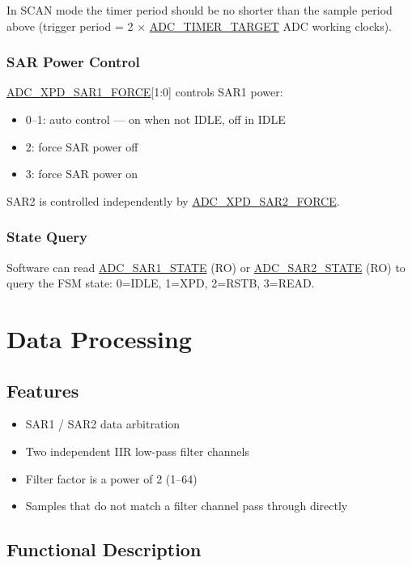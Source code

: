 \documentclass[main\_\_EN.tex]{subfiles}
\begin{document}
In SCAN mode the timer period should be no shorter than the sample period above (trigger period = 2 $\times$ \hyperref[fielddesc:ADCTIMERTARGET]{ADC\_TIMER\_TARGET} ADC working clocks).

\subsubsection{SAR Power Control}
\hyperref[fielddesc:ADCXPDSAR1FORCE]{ADC\_XPD\_SAR1\_FORCE}[1:0] controls SAR1 power:
\begin{itemize}
    \item 0--1: auto control --- on when not IDLE, off in IDLE
    \item 2: force SAR power off
    \item 3: force SAR power on
\end{itemize}
SAR2 is controlled independently by \hyperref[fielddesc:ADCXPDSAR2FORCE]{ADC\_XPD\_SAR2\_FORCE}.

\subsubsection{State Query}
Software can read \hyperref[fielddesc:ADCSAR1STATE]{ADC\_SAR1\_STATE} (RO) or \hyperref[fielddesc:ADCSAR2STATE]{ADC\_SAR2\_STATE} (RO) to query the FSM state: 0=IDLE, 1=XPD, 2=RSTB, 3=READ.


\section{Data Processing}
\label{sec:adc-datapath}

\subsection{Features}
\begin{itemize}
    \item SAR1 / SAR2 data arbitration
    \item Two independent IIR low-pass filter channels
    \item Filter factor is a power of 2 (1--64)
    \item Samples that do not match a filter channel pass through directly
\end{itemize}

\subsection{Functional Description}
\label{sec:adc-datapath-func-descr}
\end{document}
